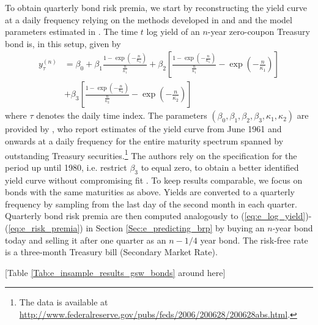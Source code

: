 \documentclass[12pt,letterpaper,leqno,doublespacing]{article}
\begin{document}
To obtain quarterly bond risk premia, we start by reconstructing the yield curve at a daily frequency relying on the methods developed in \cite{NelsonSiegel1987} and \cite{Svensson1994} and the model parameters estimated in \cite{GurkaynakSackWright2007}. The time $t$ log yield of an $n$-year zero-coupon Treasury bond is, in this setup, given by 
\begin{align}
    y_{\tau}^{\left(n\right)} & = 
        \beta_{0} + 
        \beta_{1} \frac{1-\exp\left(-\frac{n}{\kappa_{1}}\right)}{\frac{n}{\kappa_{1}}} + 
        \beta_{2} \left[\frac{1-\exp\left(-\frac{n}{\kappa_{1}}\right)}{\frac{n}{\kappa_{1}}} - 
        \exp\left(-\frac{n}{\kappa_{1}}\right)\right] \nonumber \\ 
    & + \beta_{3} \left[\frac{1-\exp\left(-\frac{n}{\kappa_{2}}\right)}{\frac{n}{\kappa_{2}}} - 
        \exp\left(-\frac{n}{\kappa_{2}}\right)\right]
    \label{Eq:e_daily_yield_curve}
\end{align}
where $\tau$ denotes the daily time index. The parameters $\left(\beta_{0},\beta_{1},\beta_{2},\beta_{3},\kappa_{1},\kappa_{2}\right)$ are provided by \cite{GurkaynakSackWright2007}, who report estimates of the yield curve from June 1961 and onwards at a daily frequency for the entire maturity spectrum spanned by outstanding Treasury securities.\footnote{The data is available at \url{http://www.federalreserve.gov/pubs/feds/2006/200628/200628abs.html}.} The authors rely on the \cite{NelsonSiegel1987} specification for the period up until 1980, i.e. restrict $\beta_{3}$ to equal zero, to obtain a better identified yield curve without compromising fit \cite[p. 2297]{GurkaynakSackWright2007}. To keep results comparable, we focus on bonds with the same maturities as above. Yields are converted to a quarterly frequency by sampling from the last day of the second month in each quarter. Quarterly bond risk premia are then computed analogously to (\ref{eq:e_log_yield})-(\ref{eq:e_risk_premia}) in Section \ref{Sec:e_predicting_brp} by buying an $n$-year bond today and selling it after one quarter as an $n-1/4$ year bond. The risk-free rate is a three-month Treasury bill (Secondary Market Rate). 

\begin{center}
    [Table \ref{Tab:e_insample_results_gsw_bonds} around here]
\end{center}
\end{document}
